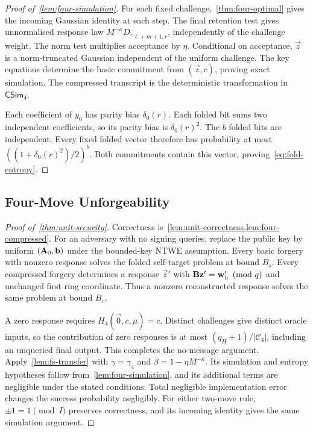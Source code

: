 \begin{proof}[Proof of~\cref{lem:four-simulation}]
For each fixed challenge,~\cref{thm:four-optimal} gives the incoming Gaussian identity at each step. The final retention test gives unnormalised response law $M^{-\kappa}D_{\ring^{\ell+m+1},r}$, independently of the challenge weight. The norm test multiplies acceptance by $\eta$. Conditional on acceptance, $\vec z$ is a norm-truncated Gaussian independent of the uniform challenge. The key equations determine the basic commitment from $(\vec z,c)$, proving exact simulation. The compressed transcript is the deterministic transformation in $\mathsf{CSim}_4$.

Each coefficient of $y_0$ has parity bias $\delta_0(r)$. Each folded bit sums two independent coefficients, so its parity bias is $\delta_0(r)^2$. The $b$ folded bits are independent. Every fixed folded vector therefore has probability at most $((1+\delta_0(r)^2)/2)^b$. Both commitments contain this vector, proving~\cref{eq:fold-entropy}.
\end{proof}

\subsection{Four-Move Unforgeability}

\begin{proof}[Proof of~\cref{thm:unit-security}]
Correctness is~\cref{lem:unit-correctness,lem:four-compressed}. For an adversary with no signing queries, replace the public key by uniform $(\mathbf{A}_0,\mathbf{b})$ under the bounded-key NTWE assumption. Every basic forgery with nonzero response solves the folded self-target problem at bound $B_s$. Every compressed forgery determines a response $\vec z'$ with $\mathbf{B}\mathbf{z}'=\mathbf{w}_h'\pmod q$ and unchanged first ring coordinate. Thus a nonzero reconstructed response solves the same problem at bound $B_v$.

A zero response requires $H_4(\vec0,c,\mu)=c$. Distinct challenges give distinct oracle inputs, so the contribution of zero responses is at most $(q_H+1)/|\mathcal C_4|$, including an unqueried final output. This completes the no-message argument. Apply~\cref{lem:fs-transfer} with $\gamma=\gamma_4$ and $\beta=1-\eta M^{-\kappa}$. Its simulation and entropy hypotheses follow from~\cref{lem:four-simulation}, and its additional terms are negligible under the stated conditions. Total negligible implementation error changes the success probability negligibly. For either two-move rule, $\pm1=1\pmod I$ preserves correctness, and its incoming identity gives the same simulation argument.
\end{proof}
\FloatBarrier
